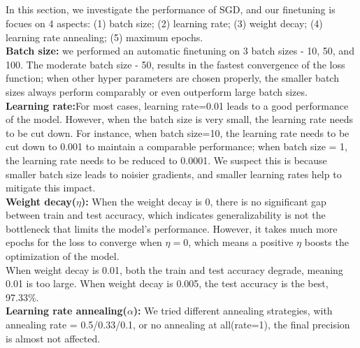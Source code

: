 \documentclass{article}
\begin{document}
        \subsection{}
        In this section, we investigate the performance of SGD, and our finetuning is focues on 4 aspects: 
        (1) batch size; (2) learning rate; (3) weight decay; (4) learning rate annealing; (5) maximum epochs.
        \vspace{5pt}\\
        \textbf{Batch size:} we performed an automatic finetuning on 3 batch sizes - 10, 50, and 100.
        The moderate batch size - 50, results in the fastest convergence of the loss function;
        when other hyper parameters are chosen properly, the smaller batch sizes always perform comparably or even outperform large batch sizes.
        \vspace{5pt}\\
        \textbf{Learning rate:}For most cases, learning rate=0.01 leads to a good performance of the model.
        However, when the batch size is very small, the learning rate needs to be cut down. 
        For instance, when batch size=10, the learning rate needs to be cut down to 0.001 to maintain a comparable performance;
        when batch size = 1, the learning rate needs to be reduced to 0.0001. 
        We suspect this is because smaller batch size leads to noisier gradients, and smaller learning rates help to mitigate this impact.
        \vspace{5pt}\\
        \textbf{Weight decay($\eta$):} When the weight decay is 0, there is no significant gap between train and test accuracy, 
        which indicates generalizability is not the bottleneck that limits the model's performance. 
        However, it takes much more epochs for the loss to converge when $\eta=0$, which means a positive $\eta$ boosts the optimization of the model.
        \vspace{5pt}\\
        When weight decay is 0.01, both the train and test accuracy degrade, meaning 0.01 is too large. 
        When weight decay is 0.005, the test accuracy is the best, 97.33\%.
        \vspace{5pt}\\
        \textbf{Learning rate annealing($\alpha$):} We tried different annealing strategies, with annealing rate = 0.5/0.33/0.1, 
        or no annealing at all(rate=1), the final precision is almost not affected.
        \vspace{5pt}\\
\end{document}
